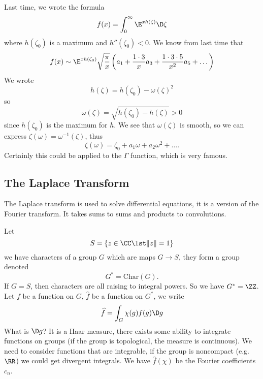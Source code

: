 Last time, we wrote the formula
\begin{equation}
f(x)=\int^{\infty}_{0}\E^{xh(\zeta)}\D\zeta
\end{equation}
where $h(\zeta_{0})$ is a maximum and $h''(\zeta_{0})<0$. We know
from last time that
\begin{equation}
f(x)\asymptote\E^{xh(\zeta_{0})}\sqrt{\frac{\pi}{x}}\left(a_{1}+\frac{1\cdot3}{x}a_{3}+\frac{1\cdot3\cdot5}{x^{2}}a_{5}+\dots\right)
\end{equation}
We wrote
\begin{equation}
h(\zeta)=h(\zeta_{0})-\omega(\zeta)^{2}
\end{equation}
so
\begin{equation}
\omega(\zeta)=\sqrt{h(\zeta_{0})-h(\zeta)}>0
\end{equation}
since $h(\zeta_{0})$ is the maximum for $h$. We see that
$\omega(\zeta)$ is smooth, so we can express
$\zeta(\omega)=\omega^{-1}(\zeta)$, thus
\begin{equation}
\zeta(\omega)=\zeta_{0}+a_{1}\omega+a_{2}\omega^{2}+\dots.
\end{equation}
Certainly this could be applied to the $\Gamma$ function, which
is very famous.

\subsection{The Laplace Transform}

The Laplace transform is used to solve differential equations, it
is a version of the Fourier transform. It takes sums to sums and
products to convolutions.

Let
\begin{equation}
S=\{z\in\CC\lst\|z\|=1\}
\end{equation}
we have characters of a group $G$ which are maps $G\to S$, they
form a group denoted
\begin{equation}
G^{*}=\mathrm{Char}(G).
\end{equation}
If $G=S$, then characters are all raising to integral powers. So
we have $G^{*}=\ZZ$. Let $f$ be a function on $G$, $\widehat{f}$
be a function on $G^{*}$, we write
\begin{equation}
\widehat{f}=\int_{G}\chi(g)f(g)\D g
\end{equation}
What is $\D g$? It is a Haar measure, there exists some ability
to integrate functions on groups (if the group is topological,
the measure is continuous). We need to consider functions that
are integrable, if the group is noncompact (e.g. $\RR$) we could
get divergent integrals. We have $\widehat{f}(\chi)$ be the
Fourier coefficients $c_{n}$.

